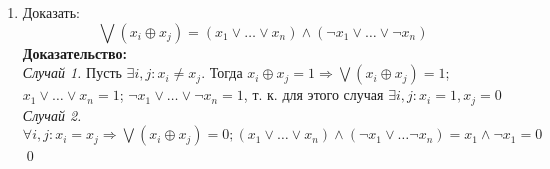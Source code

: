 \documentclass[12pt]{article}
\begin{document}
\begin{enumerate}
        \item Доказать: 
        \[ \bigvee (x_i \oplus x_j) = (x_1 \vee \dots \vee 
        x_n) \wedge (\lnot x_1 \vee \dots \vee \lnot x_n ) \]
        \textbf{Доказательство:} \\
        \textit{Случай 1.} Пусть \( \exists i, j: x_i \neq x_j \). Тогда 
        \( x_i \oplus x_j = 1 \Rightarrow \bigvee (x_i \oplus x_j) = 1 \);
        \( x_1 \vee \dots \vee x_n = 1\); \( \lnot x_1 \vee \dots
        \vee \lnot x_n = 1 \), т. к. для этого случая
        \( \exists i, j: x_i = 1, x_j = 0 \)\\
        \textit{Случай 2.} \( \forall i, j: x_i = x_j \Rightarrow 
        \bigvee (x_i \oplus x_j) = 0; (x_1 \vee \dots
        \vee x_n) \wedge (\lnot x_1 \vee \dots \lnot x_n) = 
        x_1 \wedge \lnot x_1 = 0 \)
        \qed 
    \end{enumerate}
\end{document}
